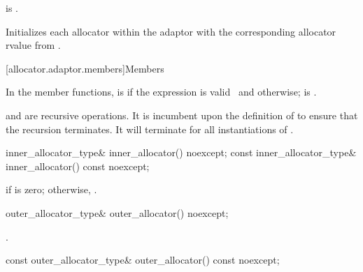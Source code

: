 \begin{itemdescr}
\pnum
\constraints
{} is .

\pnum
\effects
Initializes each allocator within the adaptor with the corresponding allocator rvalue
from .
\end{itemdescr}

[allocator.adaptor.members]{Members}

\pnum
In the  member functions,
 is
 if
the expression  is
valid~ and
 otherwise;
 is
.
\begin{note}
 and
 are recursive operations. It
is incumbent upon the definition of  to ensure that the
recursion terminates. It will terminate for all instantiations of
.
\end{note}

%
\begin{itemdecl}
inner_allocator_type& inner_allocator() noexcept;
const inner_allocator_type& inner_allocator() const noexcept;
\end{itemdecl}

\begin{itemdescr}
\pnum
\returns
{} if  is zero; otherwise,
.
\end{itemdescr}

%
\begin{itemdecl}
outer_allocator_type& outer_allocator() noexcept;
\end{itemdecl}

\begin{itemdescr}
\pnum
\returns
{}.
\end{itemdescr}

%
\begin{itemdecl}
const outer_allocator_type& outer_allocator() const noexcept;
\end{itemdecl}

